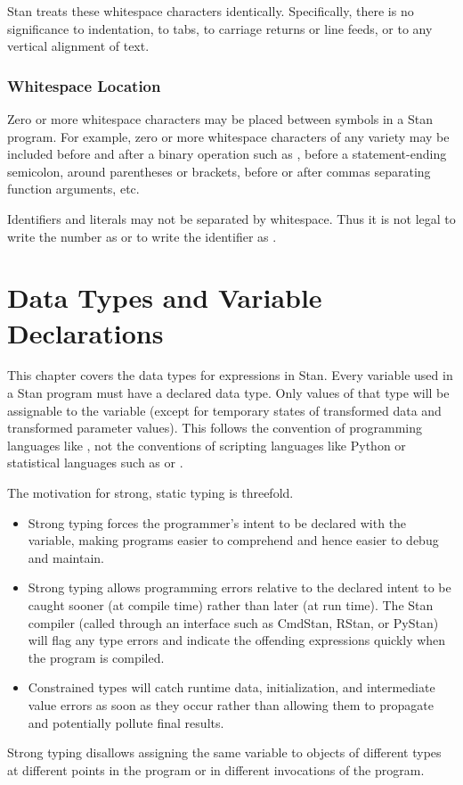 Stan treats these whitespace characters identically.  Specifically,
there is no significance to indentation, to tabs, to carriage returns
or line feeds, or to any vertical alignment of text.

\subsection{Whitespace Location}

Zero or more whitespace characters may be placed between symbols in a
Stan program.  For example, zero or more whitespace characters of any
variety may be included before and after a binary operation such as
, before a statement-ending semicolon, around parentheses
or brackets, before or after commas separating function arguments,
etc.

Identifiers and literals may not be separated by whitespace.  Thus it
is not legal to write the number  as  or to
write the identifier  as .


\chapter{Data Types and Variable
  Declarations}\label{data-types.chapter}

\noindent
This chapter covers the data types for expressions in Stan.  Every
variable used in a Stan program must have a declared data type.  Only
values of that type will be assignable to the variable (except for
temporary states of transformed data and transformed parameter
values).  This follows the convention of programming languages like
\Cpp, not the conventions of scripting languages like Python or
statistical languages such as \R or \BUGS.

The motivation for strong, static typing is threefold.
%
\begin{itemize}
\item Strong typing forces the programmer's intent to be declared with
  the variable, making programs easier to comprehend and hence easier
  to debug and maintain.
\item Strong typing allows programming errors relative to the declared
  intent to be caught sooner (at compile time) rather than later (at
  run time).  The Stan compiler (called through an interface such as
  CmdStan, RStan, or PyStan) will flag any type errors and indicate
  the offending expressions quickly when the program is compiled.
\item Constrained types will catch runtime data, initialization, and
  intermediate value errors as soon as they occur rather than allowing
  them to propagate and potentially pollute final results.
\end{itemize}
%
Strong typing disallows assigning the same variable to objects of
different types at different points in the program or in different
invocations of the program.

